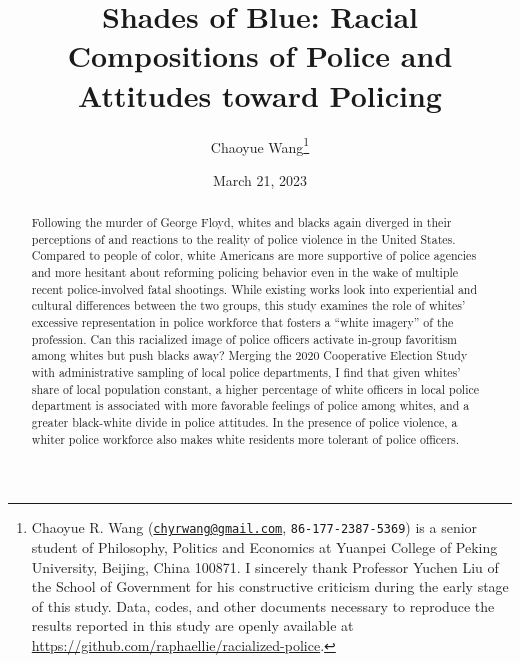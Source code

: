 \documentclass[
  12pt,
]{article}
\title{\textbf{Shades of Blue: Racial Compositions of Police and
Attitudes toward Policing}}
\author{Chaoyue Wang\footnote{Chaoyue R. Wang
  (\href{mailto:chyrwang@gmail.com}{\nolinkurl{chyrwang@gmail.com}},
  \texttt{86-177-2387-5369}) is a senior student of Philosophy, Politics
  and Economics at Yuanpei College of Peking University, Beijing, China
  100871. I sincerely thank Professor Yuchen Liu of the School of
  Government for his constructive criticism during the early stage of
  this study. Data, codes, and other documents necessary to reproduce
  the results reported in this study are openly available at
  \url{https://github.com/raphaellie/racialized-police}.}}
\date{March 21, 2023}
\begin{document}

\maketitle


\thispagestyle{empty}

\begin{abstract} 
\noindent %
Following the murder of George Floyd, whites and blacks again diverged
in their perceptions of and reactions to the reality of police violence
in the United States. Compared to people of color, white Americans are
more supportive of police agencies and more hesitant about reforming
policing behavior even in the wake of multiple recent police-involved
fatal shootings. While existing works look into experiential and
cultural differences between the two groups, this study examines the
role of whites' excessive representation in police workforce that
fosters a ``white imagery'' of the profession. Can this racialized image
of police officers activate in-group favoritism among whites but push
blacks away? Merging the 2020 Cooperative Election Study with
administrative sampling of local police departments, I find that given
whites' share of local population constant, a higher percentage of white
officers in local police department is associated with more favorable
feelings of police among whites, and a greater black-white divide in
police attitudes. In the presence of police violence, a whiter police
workforce also makes white residents more tolerant of police officers.
\end{abstract}

\begin{quote}
\end{quote}

\newpage \clearpage {}\captionsetup{labelfont = bf, font = small}




\ifdefined\Shaded\renewenvironment{Shaded}{\begin{tcolorbox}[enhanced, breakable, borderline west={3pt}{0pt}{shadecolor}, frame hidden, sharp corners, interior hidden, boxrule=0pt]}{\end{tcolorbox}}\fi
\end{document}
